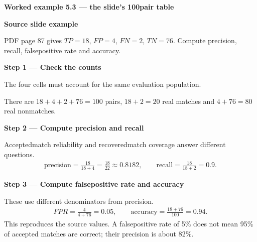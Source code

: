 \documentclass[letterpaper,11pt,english,openany,oneside]{jupyterBook}
\begin{document}
\begin{TextbookBox}
\textbf{Worked example 5.3 — the slide’s 100\sphinxhyphen{}pair table}\par\smallskip

\par\medskip\textbf{Source slide example}\par\smallskip

\sphinxAtStartPar
{} PDF page 87 gives \(TP=18\), \(FP=4\), \(FN=2\), \(TN=76\). Compute precision, recall, false\sphinxhyphen{}positive rate and accuracy.

\par\medskip

\par\medskip{}
{\color{QuizStepRed}\bfseries Step 1 — Check the counts}\par\smallskip

\sphinxAtStartPar
{} The four cells must account for the same evaluation population.

\sphinxAtStartPar
There are {\color{QuizMathBlue} \(18+4+2+76=100\)} pairs, {\color{QuizMathBlue} \(18+2=20\)} real matches and {\color{QuizMathBlue} \(4+76=80\)} real nonmatches.

\par

\par\medskip{}
{\color{QuizStepRed}\bfseries Step 2 — Compute precision and recall}\par\smallskip

\sphinxAtStartPar
{} Accepted\sphinxhyphen{}match reliability and recovered\sphinxhyphen{}match coverage answer different questions.
{\color{QuizMathBlue} \begin{equation*}
\begin{split}\text{precision}=\frac{18}{18+4}=\frac{18}{22}\approx0.8182,\qquad
\text{recall}=\frac{18}{18+2}=0.9.\end{split}
\end{equation*}}
\par

\par\medskip{}
{\color{QuizStepRed}\bfseries Step 3 — Compute false\sphinxhyphen{}positive rate and accuracy}\par\smallskip

\sphinxAtStartPar
{} These use different denominators from precision.
{\color{QuizMathBlue} \begin{equation*}
\begin{split}FPR=\frac4{4+76}=0.05,\qquad
\text{accuracy}=\frac{18+76}{100}=0.94.\end{split}
\end{equation*}}
\sphinxAtStartPar
This reproduces the source values. A false\sphinxhyphen{}positive rate of 5\% does not mean 95\% of accepted matches are correct; their precision is about 82\%.

\par

\end{TextbookBox}
\end{document}
